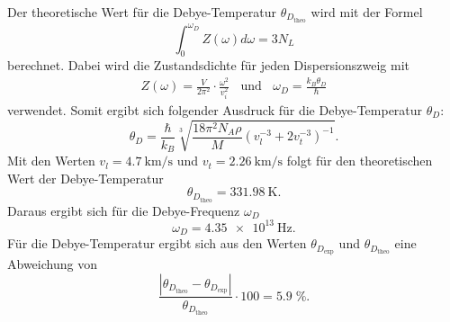 Der theoretische Wert für die Debye-Temperatur $\theta_{D_\text{theo}}$ wird mit der Formel
\begin{equation}
  \int_{0}^{\omega_D} Z(\omega) d\omega = 3N_L
\end{equation}
berechnet. Dabei wird die Zustandsdichte für jeden Dispersionszweig mit
\begin{align}
  Z(\omega)= \frac{V}{2\pi^2}\cdot\frac{\omega^2}{v_i^2}\:\:\:\:\text{und}\:\:\:\:
  \omega_D=\frac{k_B \theta_D}{\hbar}
\end{align}
verwendet.
Somit ergibt sich folgender Ausdruck für die Debye-Temperatur $\theta_D$:
\begin{equation}
  \theta_D=\frac{\hbar}{k_B}\sqrt[3]{\frac{18\pi^2 N_A \rho}{M}(v_l^{-3}+2v_t^{-3})^{-1}}.
\end{equation}
Mit den Werten $v_l=\SI{4.7}{\km\per\s}$ und $v_t=\SI{2.26}{\km\per\s}$ folgt für
den theoretischen Wert der Debye-Temperatur
\begin{equation}
  \theta_{D_\text{theo}}=\SI{331.98}{\K}.
\end{equation}
Daraus ergibt sich für die Debye-Frequenz $\omega_D$
\begin{equation}
  \omega_D=\SI{4.35e13}{\Hz}.
\end{equation}
Für die Debye-Temperatur ergibt sich aus den Werten $\theta_{D_\text{exp}}$ und $\theta_{D_\text{theo}}$
eine Abweichung von
\begin{equation}
  \frac{|\theta_{D_\text{theo}}-\theta_{D_\text{exp}}|}{\theta_{D_\text{theo}}}\cdot 100=5.9\;\%.
\end{equation}
